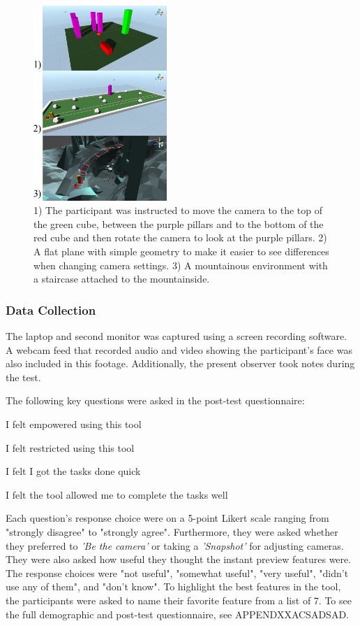 \begin{figure}[htbp]
\centering
\includegraphics[width=0.45\textwidth]{Pics/sceneAll}
\caption{1) The participant was instructed to move the camera to the top of the green cube, between the purple pillars and to the bottom of the red cube and then rotate the camera to look at the purple pillars. 2) A flat plane with simple geometry to make it easier to see differences when changing camera settings. 3) A mountainous environment with a staircase attached to the mountainside.}
\label{fig:sceneAll}
\end{figure}

\subsubsection{Data Collection}
The laptop and second monitor was captured using a screen recording software. A webcam feed  that recorded audio and video showing the participant's face was also included in this footage. Additionally, the present observer took notes during the test.

The following key questions were asked in the post-test questionnaire:

\setlength{\parindent}{1cm}
I felt empowered using this tool

\setlength{\parskip}{0pt}
I felt restricted using this tool

I felt I got the tasks done quick

I felt the tool allowed me to complete the tasks well

\setlength{\parskip}{15pt}
\setlength{\parindent}{0cm}
Each question's response choice were on a 5-point Likert scale ranging from "strongly disagree" to "strongly agree". Furthermore, they were asked whether they preferred to \textit{'Be the camera'} or taking a \textit{'Snapshot'} for adjusting cameras. They were also asked how useful they thought the instant preview features were. The response choices were "not useful", "somewhat useful", "very useful", "didn't use any of them", and "don't know". To highlight the best features in the tool, the participants were asked to name their favorite feature from a list of 7. To see the full demographic and post-test questionnaire, see APPENDXXACSADSAD. 

